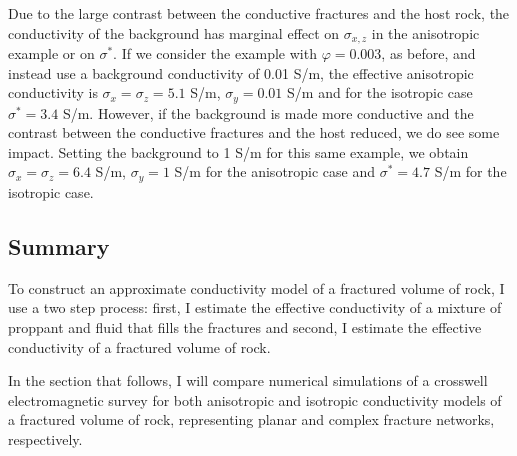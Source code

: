 Due to the large contrast between the conductive fractures and the host rock, the conductivity of the background has marginal effect on $\sigma_{x, z}$ in the anisotropic example or on $\sigma^*$. If we consider the example with $\varphi = 0.003$, as before, and instead use a background conductivity of 0.01 S/m, the effective anisotropic conductivity is $\sigma_x = \sigma_z = 5.1$ S/m, $\sigma_y = 0.01$ S/m and for the isotropic case $\sigma^* = 3.4$ S/m. However, if the background is made more conductive and the contrast between the conductive fractures and the host reduced, we do see some impact. Setting the background to 1 S/m for this same example, we obtain $\sigma_x = \sigma_z = 6.4$ S/m, $\sigma_y = 1$ S/m for the anisotropic case and $\sigma^* = 4.7$ S/m for the isotropic case.


\subsection{Summary}
To construct an approximate conductivity model of a fractured volume of rock, I use a two step process: first, I estimate the effective conductivity of a mixture of proppant and fluid that fills the fractures and second, I estimate the effective conductivity of a fractured volume of rock.

In the section that follows, I will compare numerical simulations of a crosswell electromagnetic survey for both anisotropic and isotropic conductivity models of a fractured volume of rock, representing planar and complex fracture networks, respectively.

